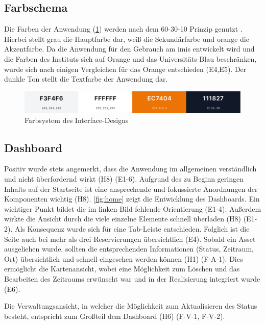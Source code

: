 \subsection{Farbschema}
Die Farben der Anwendung (\ref{fig:farben}) werden nach dem 60-30-10 Prinzip
genutzt \cite{experience_using}. Hierbei stellt grau die Hauptfarbe dar, weiß
die Sekundärfarbe und orange die Akzentfarbe. Da die Anwendung für den Gebrauch am
\ac{imis} entwickelt wird und die Farben des Instituts sich auf Orange und das
Universitäts-Blau beschränken, wurde sich nach einigen Vergleichen für das
Orange entschieden (E4,E5). Der dunkle Ton stellt die Textfarbe der Anwendung
dar.
\begin{figure}[h]
    \centering
    \includegraphics[scale=0.23]{Bilder/farben.png}
    \caption[Farbsystem des Interface-Designs]{Farbsystem des Interface-Designs}
    \label{fig:farben}
\end{figure}

\subsection{Dashboard}
Positiv wurde stets angemerkt, dass die Anwendung im allgemeinen verständlich
und nicht überfordernd wirkt (H8) (E1-6). Aufgrund des zu Beginn geringen
Inhalts auf der Startseite ist eine ansprechende und fokussierte Anordnungen der
Komponenten wichtig (H8). \ref{fig:home} zeigt die Entwicklung des Dashboards.
Ein wichtiger Punkt bildet die im linken Bild fehlende Orientierung (E1-4).
Außerdem wirkte die Ansicht durch die viele einzelne Elemente schnell
überladen (H8) (E1-2). Als Konsequenz wurde sich für eine Tab-Leiste entschieden.
Folglich ist die Seite auch bei mehr als drei Reservierungen übersichtlich (E4).
Sobald ein Asset ausgeliehen wurde, sollten die entsprechenden Informationen
(Status, Zeitraum, Ort) übersichtlich und schnell eingesehen werden können (H1)
(F-A-1). Dies ermöglicht die Kartenansicht, wobei eine Möglichkeit zum Löschen
und das Bearbeiten des Zeitraums erwünscht war und in der Realisierung
integriert wurde (E6).

Die Verwaltungsansicht, in welcher die Möglichkeit zum Aktualisieren des Status
besteht, entspricht zum Großteil dem Dashboard (H6) (F-V-1, F-V-2).

